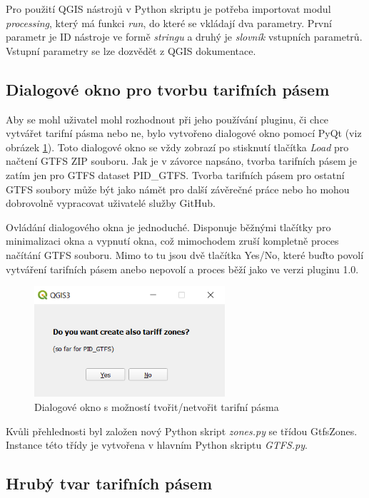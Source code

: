 Pro použití QGIS nástrojů v Python skriptu je potřeba importovat modul \textit{processing},
který má funkci \textit{run}, do které se vkládají dva parametry. První parametr je ID nástroje
ve formě \textit{stringu} a druhý je \textit{slovník} vstupních parametrů. Vstupní parametry se lze dozvědět
z QGIS dokumentace. \cite{QGIS_docs}

\subsection{Dialogové okno pro tvorbu tarifních pásem}

Aby se mohl uživatel mohl rozhodnout při jeho používání pluginu, či chce vytvářet tarifní pásma nebo ne, bylo vytvořeno
dialogové okno pomocí PyQt (viz obrázek \ref{fig:dialog}). Toto dialogové okno se vždy zobrazí po stisknutí tlačítka
\textit{Load} pro načtení GTFS ZIP souboru. Jak je v závorce napsáno, tvorba tarifních pásem je zatím jen pro GTFS
dataset PID\_GTFS.
Tvorba tarifních pásem pro ostatní GTFS soubory může být jako námět pro další závěrečné práce nebo ho mohou dobrovolně
vypracovat uživatelé služby GitHub.

Ovládání dialogového okna je jednoduché. Disponuje běžnými tlačítky pro minimalizaci okna a vypnutí okna, což mimochodem
zruší kompletně proces načítání GTFS souboru. Mimo to tu jsou dvě tlačítka Yes/No, které buďto povolí vytváření tarifních
pásem anebo nepovolí a proces běží jako ve verzi pluginu 1.0.

\begin{figure}[H] \centering
    \includegraphics[width=200pt]{./pictures/dialog.png}
    \caption[Dialogové okno s možností tvořit/netvořit tarifní pásma]{Dialogové okno s možností tvořit/netvořit tarifní pásma}
	\label{fig:dialog}                                
\end{figure}

Kvůli přehlednosti byl založen nový Python skript \textit{zones.py} se třídou GtfsZones. Instance této třídy je vytvořena
v hlavním Python skriptu \textit{GTFS.py}.

\subsection{Hrubý tvar tarifních pásem}

